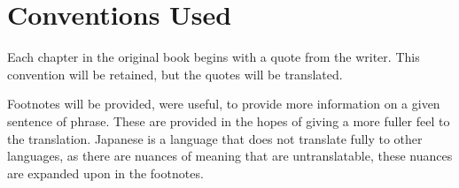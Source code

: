\section*{Conventions Used}
Each chapter in the original book begins with a quote from the writer. This convention will be retained, but the quotes will be translated.
\par Footnotes will be provided, were useful, to provide more information on a given sentence of phrase. These are provided in the hopes of giving a more fuller feel to the translation. Japanese is a language that does not translate fully to other languages, as there are nuances of meaning that are untranslatable, these nuances are expanded upon in the footnotes.